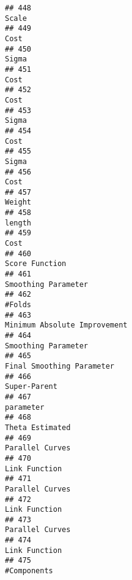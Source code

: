 \documentclass[
]{article}
\begin{document}
\begin{verbatim}
## 448                                                                                   Scale
## 449                                                                                    Cost
## 450                                                                                   Sigma
## 451                                                                                    Cost
## 452                                                                                    Cost
## 453                                                                                   Sigma
## 454                                                                                    Cost
## 455                                                                                   Sigma
## 456                                                                                    Cost
## 457                                                                                  Weight
## 458                                                                                  length
## 459                                                                                    Cost
## 460                                                                          Score Function
## 461                                                                     Smoothing Parameter
## 462                                                                                  #Folds
## 463                                                            Minimum Absolute Improvement
## 464                                                                     Smoothing Parameter
## 465                                                               Final Smoothing Parameter
## 466                                                                            Super-Parent
## 467                                                                               parameter
## 468                                                                         Theta Estimated
## 469                                                                         Parallel Curves
## 470                                                                           Link Function
## 471                                                                         Parallel Curves
## 472                                                                           Link Function
## 473                                                                         Parallel Curves
## 474                                                                           Link Function
## 475                                                                             #Components

\end{verbatim}
\end{document}
